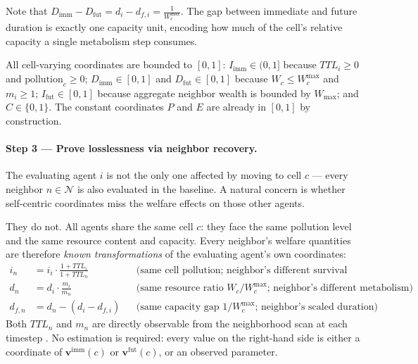 \documentclass{icsthesis}
\begin{document}
\begin{mainmatter}
Note that $D_{\mathrm{imm}} - D_{\mathrm{fut}} = d_i - d_{f,i} = \frac{1}{W_c^{\max}}$. The gap between immediate and future duration is exactly one capacity unit, encoding how much of the cell’s relative capacity a single metabolism step consumes.

All cell-varying coordinates are bounded to $[0,1]$: $I_{\mathrm{imm}} \in (0,1]$ because $TTL_i \geq 0$ and $\mathrm{pollution}_c \geq 0$; $D_{\mathrm{imm}} \in [0,1]$ and $D_{\mathrm{fut}} \in [0,1]$ because $W_c \leq W_c^{\max}$ and $m_i \geq 1$; $I_{\mathrm{fut}} \in [0,1]$ because aggregate neighbor wealth is bounded by $W_{\max}$; and $C \in \{0,1\}$. The constant coordinates $P$ and $E$ are already in $[0,1]$ by construction.

\paragraph{Step 3 --- Prove losslessness via neighbor recovery.}
The evaluating agent $i$ is not the only one affected by moving to cell $c$ --- every neighbor $n \in \mathcal{N}$ is also evaluated in the baseline. A natural concern is whether self-centric coordinates miss the welfare effects on those other agents.

They do not. All agents share the same cell $c$: they face the same pollution level and the same resource content and capacity. Every neighbor’s welfare quantities are therefore \emph{known transformations} of the evaluating agent’s own coordinates:
\begin{align*}
i_n &= i_i \cdot \frac{1 + TTL_i}{1 + TTL_n} & &\text{(same cell pollution; neighbor’s different survival horizon)} \\
d_n &= d_i \cdot \frac{m_i}{m_n} & &\text{(same resource ratio }W_c/W_c^{\max}\text{; neighbor’s different metabolism)} \\
d_{f,n} &= d_n - (d_i - d_{f,i}) & &\text{(same capacity gap }1/W_c^{\max}\text{; neighbor’s scaled duration)}
\end{align*}
Both $TTL_n$ and $m_n$ are directly observable from the neighborhood scan at each timestep \citep{KremerHerman2024b}. No estimation is required: every value on the right-hand side is either a coordinate of $\mathbf{v}^{\mathrm{imm}}(c)$ or $\mathbf{v}^{\mathrm{fut}}(c)$, or an observed parameter.


\end{mainmatter}
\end{document}

